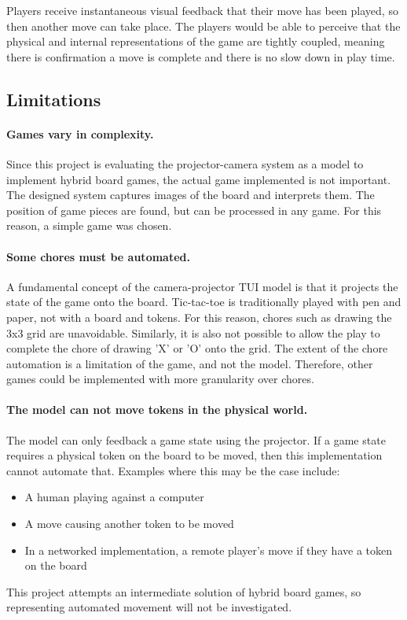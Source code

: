 \documentclass[12pt]{article}
\begin{document}
Players receive instantaneous visual feedback that their move has been played, so then another move can take place. 
The players would be able to perceive that the physical and internal representations of the game are tightly coupled, meaning there is confirmation a move is complete and there is no slow down in play time.

\subsection{Limitations}
\paragraph{Games vary in complexity.} Since this project is evaluating the projector-camera system as a model to implement hybrid board games, the actual game implemented is not important. The designed system captures images of the board and interprets them. The position of game pieces are found, but can be processed in any game. For this reason, a simple game was chosen. 

\paragraph{Some chores must be automated.} A fundamental concept of the camera-projector TUI model is that it projects the state of the game onto the board. Tic-tac-toe is traditionally played with pen and paper, not with a board and tokens. For this reason, chores such as drawing the 3x3 grid are unavoidable. Similarly, it is also not possible to allow the play to complete the chore of drawing 'X' or 'O' onto the grid. The extent of the chore automation is a limitation of the game, and not the model. Therefore, other games could be implemented with more granularity over chores. 

\paragraph{The model can not move tokens in the physical world.} The model can only feedback a game state using the projector.
If a game state requires a physical token on the board to be moved, then this implementation cannot automate that. 
Examples where this may be the case include:
\begin{itemize}
    \item A human playing against a computer
    \item A move causing another token to be moved
    \item In a networked implementation, a remote player's move if they have a token on the board
\end{itemize}
This project attempts an intermediate solution of hybrid board games, so representing automated movement will not be investigated.
\end{document}

